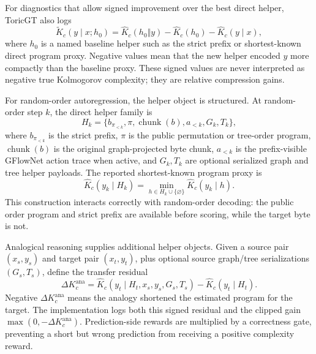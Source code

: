 \documentclass[11pt]{article}
\theoremstyle{definition}
\theoremstyle{plain}
\theoremstyle{remark}
\numberwithin{equation}{section}
\begin{document}
For diagnostics that allow signed improvement over the best direct helper, ToricGT also logs
\begin{equation}
  \widetilde K_c(y\mid x;h_0)=\widehat K_c(h_0\Vert y)-\widehat K_c(h_0)-\widehat K_c(y\mid x),
\end{equation}
where $h_0$ is a named baseline helper such as the strict prefix or shortest-known direct program proxy.  Negative values mean that the new helper encoded $y$ more compactly than the baseline proxy.  These signed values are never interpreted as negative true Kolmogorov complexity; they are relative compression gains.

For random-order autoregression, the helper object is structured.  At random-order step $k$, the direct helper family is
\begin{equation}
  H_k=\{b_{\pi_{<k}},\pi,\operatorname{chunk}(b),a_{<k},G_k,T_k\},
\end{equation}
where $b_{\pi_{<k}}$ is the strict prefix, $\pi$ is the public permutation or tree-order program, $\operatorname{chunk}(b)$ is the original graph-projected byte chunk, $a_{<k}$ is the prefix-visible GFlowNet action trace when active, and $G_k,T_k$ are optional serialized graph and tree helper payloads.  The reported shortest-known program proxy is
\begin{equation}
  \widehat K_c(y_k\mid H_k)
  =\min_{h\in H_k\cup\{\varnothing\}}\widehat K_c(y_k\mid h).
\end{equation}
This construction interacts correctly with random-order decoding: the public order program and strict prefix are available before scoring, while the target byte is not.

Analogical reasoning supplies additional helper objects.  Given a source pair $(x_s,y_s)$ and target pair $(x_t,y_t)$, plus optional source graph/tree serializations $(G_s,T_s)$, define the transfer residual
\begin{equation}
  \Delta K_c^{\mathrm{ana}}
  =
  \widehat K_c(y_t\mid H_t,x_s,y_s,G_s,T_s)
  -
  \widehat K_c(y_t\mid H_t).
\end{equation}
Negative $\Delta K_c^{\mathrm{ana}}$ means the analogy shortened the estimated program for the target.  The implementation logs both this signed residual and the clipped gain $\max(0,-\Delta K_c^{\mathrm{ana}})$.  Prediction-side rewards are multiplied by a correctness gate, preventing a short but wrong prediction from receiving a positive complexity reward.
\end{document}
